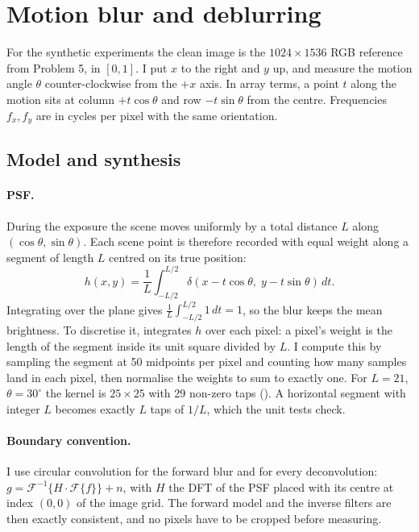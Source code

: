 \section{Motion blur and deblurring}

For the synthetic experiments the clean image is the $1024\times1536$ RGB
reference from Problem 5, in $[0,1]$. I put $x$ to the right and $y$ up, and
measure the motion angle $\theta$ counter-clockwise from the $+x$ axis. In array
terms, a point $t$ along the motion sits at column $+t\cos\theta$ and row
$-t\sin\theta$ from the centre. Frequencies $f_x,f_y$ are in cycles per pixel
with the same orientation.

\subsection{Model and synthesis}

\paragraph{PSF.} During the exposure the scene moves uniformly by a total
distance $L$ along $(\cos\theta,\sin\theta)$. Each scene point is therefore
recorded with equal weight along a segment of length $L$ centred on its true
position:
\begin{equation}
h(x,y)=\frac1L\int_{-L/2}^{L/2}\delta(x-t\cos\theta,\;y-t\sin\theta)\,dt .
\end{equation}
Integrating over the plane gives $\frac1L\int_{-L/2}^{L/2}1\,dt=1$, so the blur
keeps the mean brightness. To discretise it,  integrates $h$
over each pixel: a pixel's weight is the length of the segment inside its unit
square divided by $L$. I compute this by sampling the segment at 50 midpoints per
pixel and counting how many samples land in each pixel, then normalise the
weights to sum to exactly one. For $L=21$, $\theta=30^\circ$ the kernel is
$25\times25$ with 29 non-zero taps (). A horizontal segment
with integer $L$ becomes exactly $L$ taps of $1/L$, which the unit tests check.

\paragraph{Boundary convention.} I use circular convolution for the forward blur
and for every deconvolution: $g=\mathcal F^{-1}\{H\cdot\mathcal F\{f\}\}+n$, with
$H$ the DFT of the PSF placed with its centre at index $(0,0)$ of the image grid.
The forward model and the inverse filters are then exactly consistent, and no
pixels have to be cropped before measuring.

